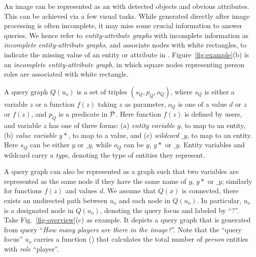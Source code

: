 

An image can be represented as an  with detected objects and obvious attributes. This can be achieved via a few visual tasks. While  generated directly after image processing is often incomplete, \ie it may miss some crucial information to answer queries. We hence refer to {\em entity-attribute graphs} with incomplete information as {\em incomplete entity-attribute graphs}, and associate nodes with white rectangles, to indicate the missing value of an entity or attribute in . Figure~\ref{fig:example}(b) is an {\em incomplete entity-attribute graph}, in which square nodes representing person roles are associated with white rectangle. 

  A query graph $Q(u_o)$ is a set of triples
$(s_Q, p_Q, o_Q)$, where $s_Q$ is either a variable $z$ or a function $f(z)$ taking $z$ as parameter, $o_Q$ is one of a value $d$ or $z$ or $f(z)$, and $p_Q$ is a predicate in ${\cal P}$. Here function $f(z)$ is defined by users, and variable $z$ has one
of three forms: (a) {\em entity variable} $y$, to map to an entity, (b)
{\em value variable} $y*$, to map to a value, and (c) {\em wildcard} $\_y$, to
map to an entity. Here $s_Q$ can be either $y$ or $\_y$, while $o_Q$ can
be $y$, $y*$ or $\_y$. Entity variables and wildcard carry a {\em type},
denoting the type of entities they represent. 

A query graph can also be represented as a graph such
that two variables are represented as the same node if they
have the same name of $y$, $y*$ or $\_y$; similarly for functions $f(z)$ and values $d$.
We assume \kwlog that $Q(x)$ is connected, \ie there exists
an undirected path between $u_o$ and each node in $Q(u_o)$.
In particular, $u_o$ is a designated node in $Q(u_o)$, denoting the query focus and labeled by ``?''. %
Take Fig.~\ref{fig-overview}(c) as example. It depicts a query graph that is generated from query ``{\em How many players are there in the image?}''. Note that the ``query focus'' $u_o$ carries a function () that calculates the total number of {\em person} entities with {\em role} ``player''. 


